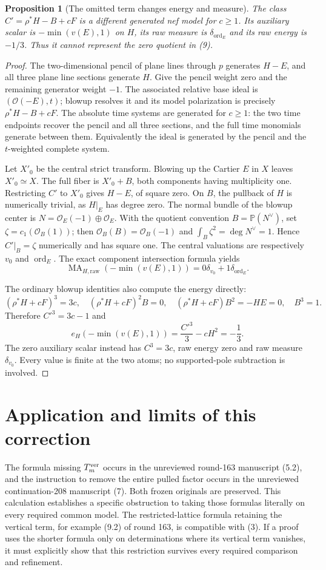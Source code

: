 \documentclass[11pt]{article}
\newtheorem{proposition}[theorem]{Proposition}
\newcommand{\OO}{\mathcal O}
\newcommand{\MA}{\operatorname{MA}}
\begin{document}
\begin{proposition}[The omitted term changes energy and measure]
The class $C'=\rho^*H-B+cF$ is a different generated nef model for
$c\geq1$. Its auxiliary scalar is $-\min(v(E),1)$ on $H$, its raw
measure is $\delta_{\operatorname{ord}_E}$ and its raw energy is
$-1/3$. Thus it cannot represent the zero quotient in (9).
\end{proposition}
\begin{proof}
The two-dimensional pencil of plane lines through $p$ generates
$H-E$, and all three plane line sections generate $H$. Give the
pencil weight zero and the remaining generator weight $-1$.
The associated relative base ideal is $(\OO(-E),t)$; blowup resolves
it and its model polarization is precisely $\rho^*H-B+cF$.
The absolute time systems are generated for $c\geq1$: the two
time endpoints recover the pencil and all three sections, and the
full time monomials generate between them. Equivalently the ideal
is generated by the pencil and the $t$-weighted complete system.

Let $X'_0$ be the central strict transform. Blowing up the Cartier
$E$ in $X$ leaves $X'_0\simeq X$. The full fiber is $X'_0+B$, both
components having multiplicity one. Restricting $C'$ to $X'_0$
gives $H-E$, of square zero. On $B$, the pullback of $H$ is numerically
trivial, as $H|_E$ has degree zero. The normal bundle of the blowup
center is $N=\OO_E(-1)\oplus\OO_E$. With the quotient convention
$B=\mathbb P(N^\vee)$, set $\zeta=c_1(\OO_B(1))$; then
$\OO_B(B)=\OO_B(-1)$ and $\int_B\zeta^2=\deg N^\vee=1$.
Hence $C'|_B=\zeta$ numerically and has square one.
The central valuations are respectively $v_0$ and $\operatorname{ord}_E$.
The exact component intersection formula yields
\[
 \MA_{H,\mathrm{raw}}(-\min(v(E),1))
          =0\delta_{v_0}+1\delta_{\operatorname{ord}_E}. \tag{10}
\]

The ordinary blowup identities also compute the energy directly:
\[
 (\rho^*H+cF)^3=3c,\quad
 (\rho^*H+cF)^2B=0,\quad
 (\rho^*H+cF)B^2=-H E=0,\quad B^3=1.
\]
Therefore $C'^3=3c-1$ and
\[
 e_H(-\min(v(E),1))=\frac{C'^3}{3}-cH^2=-\frac13.     \tag{11}
\]
The zero auxiliary scalar instead has $C^3=3c$, raw energy zero
and raw measure $\delta_{v_0}$. Every value is finite at the two
atoms; no supported-pole subtraction is involved.
\end{proof}

\section*{Application and limits of this correction}
The formula missing $T_m^{\rm ver}$ occurs in the unreviewed
round-163 manuscript (5.2), and the instruction to remove the entire
pulled factor occurs in the unreviewed continuation-208 manuscript (7).
Both frozen originals are preserved. This calculation establishes a
specific obstruction to taking those formulas literally on every
required common model. The restricted-lattice formula retaining the
vertical term, for example (9.2) of round 163, is compatible with (3).
If a proof uses the shorter formula only on determinations where its
vertical term vanishes, it must explicitly show that this restriction
survives every required comparison and refinement.
\end{document}
